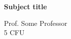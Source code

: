 \documentclass[\main/main.tex]{subfiles}
\begin{document}
\begin{titlepage}
    \begin{center}
        \vspace*{1em}
        
        \textbf{\large{Subject title}}
        
        \vspace{1em}
        Prof. Some Professor
        \\
        \small{5 CFU}
        \vspace{1em}
        
		 
        
    \end{center}
\end{titlepage}
\end{document}
